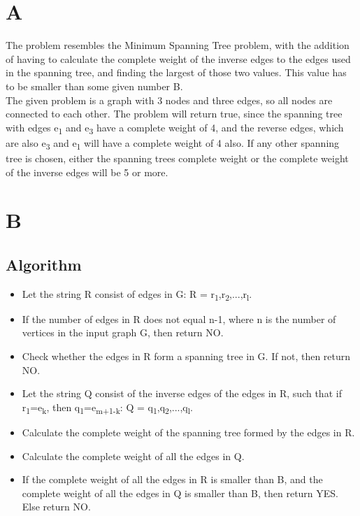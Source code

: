 \section{A}

The problem resembles the Minimum Spanning Tree problem, with the addition of having to calculate the complete weight of the inverse edges to the edges used in the spanning tree, and finding the largest of those two values. This value has to be smaller than some given number B. \\
	
	The given problem is a graph with 3 nodes and three edges, so all nodes are connected to each other. The problem will return true, since the spanning tree with edges e\textsubscript{1} and e\textsubscript{3} have a complete weight of 4, and the reverse edges, which are also e\textsubscript{3} and e\textsubscript{1} will have a complete weight of 4 also. If any other spanning tree is chosen, either the spanning trees complete weight or the complete weight of the inverse edges will be 5 or more. 	\\

\section{B}

\subsection{Algorithm}
\begin{itemize}
\item Let the string R consist of edges in G: R = r\textsubscript{1},r\textsubscript{2},...,r\textsubscript{l}.
\item If the number of edges in R does not equal n-1, where n is the number of vertices in the input graph G, then return NO.
\item Check whether the edges in R form a spanning tree in G. If not, then return NO.
\item Let the string Q consist of the inverse edges of the edges in R, such that if r\textsubscript{1}=e\textsubscript{k}, then q\textsubscript{1}=e\textsubscript{m+1-k}: Q = q\textsubscript{1},q\textsubscript{2},...,q\textsubscript{l}. 
\item Calculate the complete weight of the spanning tree formed by the edges in R.
\item Calculate the complete weight of all the edges in Q.
\item If the complete weight of all the edges in R is smaller than B, and the complete weight of all the edges in Q is smaller than B, then return YES. Else return NO.\\
\end{itemize}
